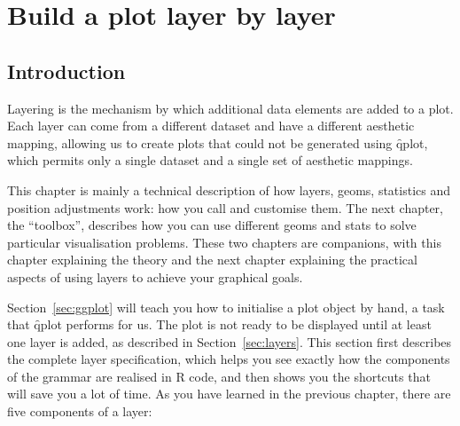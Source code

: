 

% 


\chapter{Build a plot layer by layer}
\label{cha:layers}

\section{Introduction}

Layering is the mechanism by which additional data elements are added to a plot.  Each layer can come from a different dataset and have a different aesthetic mapping, allowing us to create plots that could not be generated using \f{qplot}, which permits only a single dataset and a single set of aesthetic mappings.

This chapter is mainly a technical description of how layers, geoms, statistics and position adjustments work: how you call and customise them.  The next chapter, the ``toolbox'', describes how you can use different geoms and stats to solve particular visualisation problems.  These two chapters are companions, with this chapter explaining the theory and the next chapter explaining the practical aspects of using layers to achieve your graphical goals.

Section~\ref{sec:ggplot} will teach you how to initialise a plot object by hand, a task that \f{qplot} performs for us.  The plot is not ready to be displayed until at least one layer is added, as described in Section~\ref{sec:layers}.  This section first describes the complete layer specification, which helps you see exactly how the components of the grammar are realised in R code, and then shows you the shortcuts that will save you a lot of time.  As you have learned in the previous chapter, there are five components of a layer:

